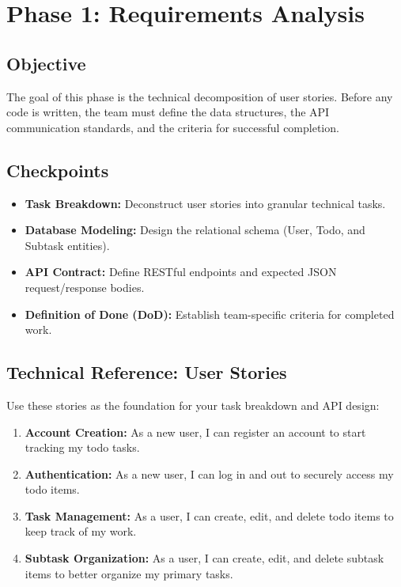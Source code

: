 \newpage
\section{Phase 1: Requirements Analysis}\label{sec:phase1}

\subsection{Objective}
The goal of this phase is the technical decomposition of user stories. Before any code is written,
the team must define the data structures, the API communication standards, and the criteria for
successful completion.

\subsection{Checkpoints}
\begin{itemize}
  \item[$\checkmark$] \textbf{Task Breakdown:} Deconstruct user stories into granular technical tasks.
  \item[$\checkmark$] \textbf{Database Modeling:} Design the relational schema (User, Todo, and Subtask entities).
  \item[$\checkmark$] \textbf{API Contract:} Define RESTful endpoints and expected JSON request/response bodies.
  \item[$\checkmark$] \textbf{Definition of Done (DoD):} Establish team-specific criteria for completed work.
\end{itemize}

\subsection{Technical Reference: User Stories}
Use these stories as the foundation for your task breakdown and API design:
\begin{enumerate}
  \item \textbf{Account Creation:} As a new user, I can register an account to start tracking my todo tasks.
  \item \textbf{Authentication:} As a new user, I can log in and out to securely access my todo items.
  \item \textbf{Task Management:} As a user, I can create, edit, and delete todo items to keep track of my work.
  \item \textbf{Subtask Organization:} As a user, I can create, edit, and delete subtask items to better organize my primary tasks.
\end{enumerate}

